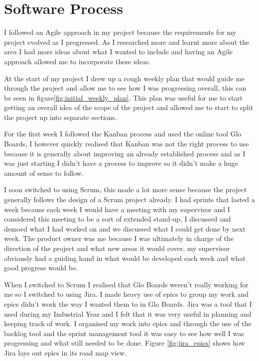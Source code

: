 \chapter{Software Process}

I followed an Agile approach in my project because the requirements for my project evolved as I progressed. As I researched more and learnt more about the area I had more ideas about what I wanted to include and having an Agile approach allowed me to incorporate these ideas. 

At the start of my project I drew up a rough weekly plan that would guide me through the project and allow me to see how I was progressing overall, this can be seen in figure\ref{fig:initial_weekly_plan}. This plan was useful for me to start getting an overall idea of the scope of the project and allowed me to start to split the project up into separate sections.

For the first week I followed the Kanban process and used the online tool Glo Boards\cite{glo_board}, I however quickly realised that Kanban was not the right process to use because it is generally about improving an already established process and as I was just starting I didn't have a process to improve so it didn't make a huge amount of sense to follow. 

I soon switched to using Scrum, this made a lot more sense because the project generally follows the design of a Scrum project already. I had sprints that lasted a week because each week I would have a meeting with my supervisor and I considered this meeting to be a sort of extended stand-up, I discussed and demoed what I had worked on and we discussed what I could get done by next week. The product owner was me because I was ultimately in charge of the direction of the project and what new areas it would cover, my supervisor obviously had a guiding hand in what would be developed each week and what good progress would be.

When I switched to Scrum I realised that Glo Boards weren't really working for me so I switched to using Jira\cite{jira_site}. I made heavy use of epics to group my work and epics didn't work the way I wanted them to in Glo Boards. Jira was a tool that I used during my Industrial Year and I felt that it was very useful in planning and keeping track of work. I organised my work into epics and through the use of the backlog tool and the sprint management tool it was easy to see how well I was progressing and what still needed to be done. Figure \ref{fig:jira_epics} shows how Jira lays out epics in its road map view.

